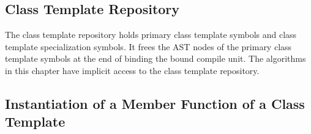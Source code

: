 \documentclass[a4paper,oneside,11pt]{book}
\theoremstyle{definition}
\begin{document}
\subsection{Class Template Repository}\label{classtemplaterepository}

The class template repository holds primary class template symbols and class template specialization symbols.
It frees the AST nodes of the primary class template symbols at the end of binding the bound compile unit.
The algorithms in this chapter have implicit access to the class template repository.

\subsection{Instantiation of a Member Function of a Class Template}
\end{document}
